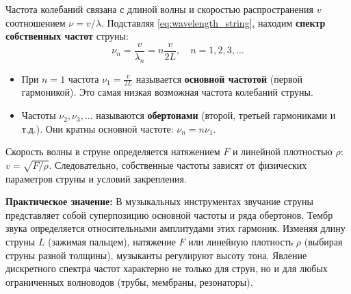 \begin{property}
Частота колебаний связана с длиной волны и скоростью распространения $v$ соотношением $\nu = v/\lambda$. Подставляя \eqref{eq:wavelength_string}, находим \textbf{спектр собственных частот} струны:
\begin{equation}
    \nu_n = \frac{v}{\lambda_n} = n \frac{v}{2L}, \quad n = 1, 2, 3, \dots \label{eq:frequencies_string}
\end{equation}
\begin{itemize}
    \item При $n=1$ частота $\nu_1 = \frac{v}{2L}$ называется \textbf{основной частотой} (первой гармоникой). Это самая низкая возможная частота колебаний струны.
    \item Частоты $\nu_2, \nu_3, \dots$ называются \textbf{обертонами} (второй, третьей гармониками и т.д.). Они кратны основной частоте: $\nu_n = n \nu_1$.
\end{itemize}
Скорость волны в струне определяется натяжением $F$ и линейной плотностью $\rho$: $v = \sqrt{F/\rho}$. Следовательно, собственные частоты зависят от физических параметров струны и условий закрепления.
\end{property}

\begin{remark}
\textbf{Практическое значение:} В музыкальных инструментах звучание струны представляет собой суперпозицию основной частоты и ряда обертонов. Тембр звука определяется относительными амплитудами этих гармоник. Изменяя длину струны $L$ (зажимая пальцем), натяжение $F$ или линейную плотность $\rho$ (выбирая струны разной толщины), музыканты регулируют высоту тона. Явление дискретного спектра частот характерно не только для струн, но и для любых ограниченных волноводов (трубы, мембраны, резонаторы).
\end{remark}

